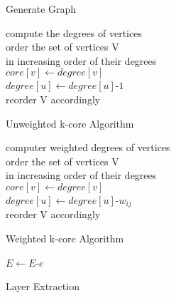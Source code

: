 \begin{itemize}
\begin{algorithm}
{{     }
 }
 
 \caption{Generate Graph}
 \end{algorithm}
 
\begin{algorithm}
 

compute the degrees of vertices \\
order the set of vertices V \\
in increasing order of their degrees \\
 {
    $core[v] \gets degree[v]$ \\
     {  
         {
            $degree[u] \gets degree[u] $-$ 1$   \\
            reorder V accordingly
        }
    }
}
\caption{Unweighted k-core Algorithm}
\end{algorithm}


\begin{algorithm}
 

computer weighted degrees of vertices  \\
order the set of vertices V \\
in increasing order of their degrees \\
 {
    $core[v] \gets degree[v]$ \\
     {  
         {
            $degree[u] \gets degree[u] $-$ w_{ij}$  \\
            reorder V accordingly
        }
    }
}
\caption{Weighted k-core Algorithm}
\end{algorithm}

\begin{algorithm}
 

 {
     {
       $E \gets E$-$e$   \\
    }
}
\caption{Layer Extraction}
\end{algorithm}


\end{itemize}
